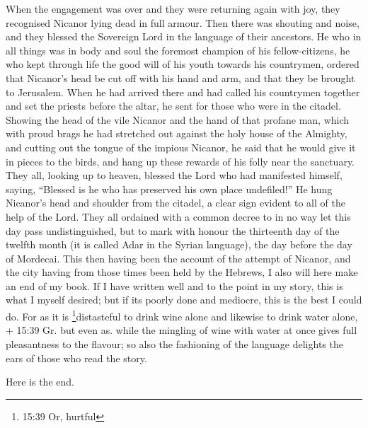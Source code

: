  When the engagement was over and they were returning again
with joy, they recognised Nicanor lying dead in full armour.
 Then there was shouting and noise, and they blessed the
Sovereign Lord in the language of their ancestors.  He who
in all things was in body and soul the foremost champion of his
fellow-citizens, he who kept through life the good will of his youth
towards his countrymen, ordered that Nicanor's head be cut off with his
hand and arm, and that they be brought to Jerusalem.  When
he had arrived there and had called his countrymen together and set the
priests before the altar, he sent for those who were in the citadel.
 Showing the head of the vile Nicanor and the hand of that
profane man, which with proud brags he had stretched out against the
holy house of the Almighty,  and cutting out the tongue of
the impious Nicanor, he said that he would give it in pieces to the
birds, and hang up these rewards of his folly near the sanctuary.
 They all, looking up to heaven, blessed the Lord who had
manifested himself, saying, ``Blessed is he who has preserved his own
place undefiled!''  He hung Nicanor's head and shoulder
from the citadel, a clear sign evident to all of the help of the Lord.
 They all ordained with a common decree to in no way let
this day pass undistinguished, but to mark with honour the thirteenth
day of the twelfth month (it is called Adar in the Syrian language), the
day before the day of Mordecai.  This then having been the
account of the attempt of Nicanor, and the city having from those times
been held by the Hebrews, I also will here make an end of my book.
 If I have written well and to the point in my story, this
is what I myself desired; but if its poorly done and mediocre, this is
the best I could do.  For as it is \footnote{15:39 Or,
  hurtful}distasteful to drink wine alone and likewise to drink water
alone, + 15:39 Gr. but even as. while the mingling of wine with water at
once gives full pleasantness to the flavour; so also the fashioning of
the language delights the ears of those who read the story.

Here is the end.
